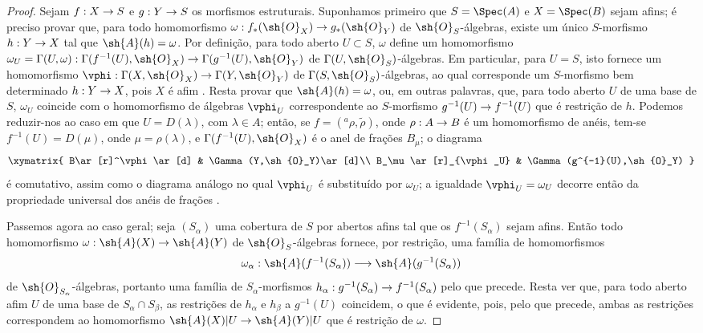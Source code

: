 \documentclass[oneside,10pt]{amsart}
\makeatletter
\newcommand{\ega@arrow}[2]{\mathchoice{#1}{#2}{#2}{#2}}
\renewcommand{\to}{\ega@arrow{\longrightarrow}{\rightarrow}}
\newcommand{\oldpage}[2][]{\marginnote{\normalfont\footnotesize\textbf{#1}~|~#2}\ignorespaces}
\makeatother
\begin{document}
\begin{proof}
Sejam $f:X\to S$ e $g:Y\to S$ os morfismos estruturais.
Suponhamos primeiro que $S=\Spec(A)$ e $X=\Spec(B)$ sejam afins; é preciso provar que, para todo homomorfismo $\omega:f_*(\sh{O}_X)\to g_*(\sh{O}_Y)$ de $\sh{O}_S$-álgebras, existe um único $S$-morfismo $h:Y\to X$ tal que $\sh{A}(h)=\omega$.
Por definição, para todo aberto $U\subset S$, $\omega$ define um homomorfismo $\omega_U=\Gamma(U,\omega):\Gamma(f^{-1}(U),\sh{O}_X)\to\Gamma(g^{-1}(U),\sh{O}_Y)$ de $\Gamma(U,\sh{O}_S)$-álgebras.
Em particular, para $U=S$, isto fornece um homomorfismo $\vphi:\Gamma(X,\sh{O}_X)\to\Gamma(Y,\sh{O}_Y)$ de $\Gamma(S,\sh{O}_S)$-álgebras, ao qual corresponde um $S$-morfismo bem determinado $h:Y\to X$, pois $X$ é afim .
Resta provar que $\sh{A}(h)=\omega$, ou, em outras palavras, que, para todo aberto $U$ de uma base de $S$, $\omega_U$ coincide com o homomorfismo de álgebras $\vphi_U$ correspondente ao $S$-morfismo $g^{-1}(U)\to f^{-1}(U)$ que é restrição de $h$.
Podemos reduzir-nos ao caso em que $U=D(\lambda)$, com $\lambda\in A$; então, se $f=({}^a\rho,\widetilde{\rho})$, onde $\rho:A\to B$ é um homomorfismo de anéis, tem-se $f^{-1}(U)=D(\mu)$, onde $\mu=\rho(\lambda)$, e $\Gamma(f^{-1}(U),\sh{O}_X)$ é o anel de frações $B_\mu$; o diagrama
\[
  \xymatrix{
    B\ar[r]^\vphi\ar[d] &
    \Gamma(Y,\sh{O}_Y)\ar[d]\\
    B_\mu\ar[r]_{\vphi_U} &
    \Gamma(g^{-1}(U),\sh{O}_Y)
  }
\]
é comutativo, assim como o diagrama análogo no qual $\vphi_U$ é substituído por $\omega_U$; a igualdade $\vphi_U=\omega_U$ decorre então da propriedade universal dos anéis de frações .

Passemos agora ao caso geral; seja $(S_\alpha)$ uma cobertura de $S$ por abertos afins
\oldpage[II]{8}
tal que os $f^{-1}(S_\alpha)$ sejam afins.
Então todo homomorfismo $\omega:\sh{A}(X)\to\sh{A}(Y)$ de $\sh{O}_S$-álgebras fornece, por restrição, uma família de homomorfismos
\[
  \omega_\alpha:\sh{A}(f^{-1}(S_\alpha))\to\sh{A}(g^{-1}(S_\alpha))
\]
de $\sh{O}_{S_\alpha}$-álgebras, portanto uma família de $S_\alpha$-morfismos $h_\alpha:g^{-1}(S_\alpha)\to f^{-1}(S_\alpha)$ pelo que precede.
Resta ver que, para todo aberto afim $U$ de uma base de $S_\alpha\cap S_\beta$, as restrições de $h_\alpha$ e $h_\beta$ a $g^{-1}(U)$ coincidem, o que é evidente, pois, pelo que precede, ambas as restrições correspondem ao homomorfismo $\sh{A}(X)|U\to\sh{A}(Y)|U$ que é restrição de $\omega$.
\end{proof}
\end{document}
